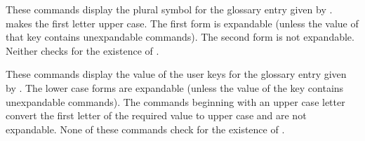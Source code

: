 \documentclass[report,inlinetitle]{nlctdoc}
\begin{document}
\begin{definition}[\DescribeMacro{\glsentrysymbolplural}]
\end{definition}
\begin{definition}[\DescribeMacro{\Glsentrysymbolplural}]
\end{definition}
These commands display the plural symbol for the glossary entry
given by .  makes the first
letter upper case.
The first form is expandable (unless the value of that key contains unexpandable
commands). The second form is not expandable. Neither checks for the
existence of .

\begin{definition}[\DescribeMacro{\glsentryuseri}]
\end{definition}
\begin{definition}[\DescribeMacro{\Glsentryuseri}]
\end{definition}
\begin{definition}[\DescribeMacro{\glsentryuserii}]
\end{definition}
\begin{definition}[\DescribeMacro{\Glsentryuserii}]
\end{definition}
\begin{definition}[\DescribeMacro{\glsentryuseriii}]
\end{definition}
\begin{definition}[\DescribeMacro{\Glsentryuseriii}]
\end{definition}
\begin{definition}[\DescribeMacro{\glsentryuseriv}]
\end{definition}
\begin{definition}[\DescribeMacro{\Glsentryuseriv}]
\end{definition}
\begin{definition}[\DescribeMacro{\glsentryuserv}]
\end{definition}
\begin{definition}[\DescribeMacro{\Glsentryuserv}]
\end{definition}
\begin{definition}[\DescribeMacro{\glsentryuservi}]
\end{definition}
\begin{definition}[\DescribeMacro{\Glsentryuservi}]
\end{definition}
These commands display the value of the user keys for the glossary
entry given by .
The lower case forms are expandable (unless the value of the key
contains unexpandable commands). The commands beginning with an
upper case letter convert the first letter of the required value to
upper case and are not expandable. None of these commands check for
the existence of .
\end{document}
